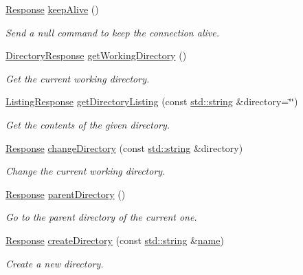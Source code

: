 \begin{DoxyCompactItemize}
\hyperlink{classsf_1_1_ftp_1_1_response}{Response} \hyperlink{classsf_1_1_ftp_aa1127d442b4acb2105aa8060a39d04fc}{keep\-Alive} ()
\begin{DoxyCompactList}\small\item\em Send a null command to keep the connection alive. \end{DoxyCompactList}\item 
\hyperlink{classsf_1_1_ftp_1_1_directory_response}{Directory\-Response} \hyperlink{classsf_1_1_ftp_a79c654fcdd0c81e68c4fa29af3b45e0c}{get\-Working\-Directory} ()
\begin{DoxyCompactList}\small\item\em Get the current working directory. \end{DoxyCompactList}\item 
\hyperlink{classsf_1_1_ftp_1_1_listing_response}{Listing\-Response} \hyperlink{classsf_1_1_ftp_a8f37258e461fcb9e2a0655e9df0be4a0}{get\-Directory\-Listing} (const \hyperlink{gl3_8h_ac83513893df92266f79a515488701770}{std\-::string} \&directory=\char`\"{}\char`\"{})
\begin{DoxyCompactList}\small\item\em Get the contents of the given directory. \end{DoxyCompactList}\item 
\hyperlink{classsf_1_1_ftp_1_1_response}{Response} \hyperlink{classsf_1_1_ftp_a7e93488ea6330dd4dd76e428da9bb6d3}{change\-Directory} (const \hyperlink{gl3_8h_ac83513893df92266f79a515488701770}{std\-::string} \&directory)
\begin{DoxyCompactList}\small\item\em Change the current working directory. \end{DoxyCompactList}\item 
\hyperlink{classsf_1_1_ftp_1_1_response}{Response} \hyperlink{classsf_1_1_ftp_ad295cf77f30f9ad07b5c401fd9849189}{parent\-Directory} ()
\begin{DoxyCompactList}\small\item\em Go to the parent directory of the current one. \end{DoxyCompactList}\item 
\hyperlink{classsf_1_1_ftp_1_1_response}{Response} \hyperlink{classsf_1_1_ftp_a247b84c4b25da37804218c2b748c4787}{create\-Directory} (const \hyperlink{gl3_8h_ac83513893df92266f79a515488701770}{std\-::string} \&\hyperlink{gl3_8h_aaced7cfc21e7d37775d6921bb8177239}{name})
\begin{DoxyCompactList}\small\item\em Create a new directory. \end{DoxyCompactList}\item 

\end{DoxyCompactItemize}
